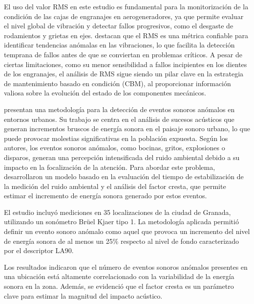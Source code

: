 El uso del valor RMS en este estudio es fundamental para la monitorización de la condición de las cajas de engranajes en aerogeneradores, ya que permite evaluar el nivel global de vibración y detectar fallos progresivos, como el desgaste de rodamientos y grietas en ejes. \citeauthor{igba_analysing_2016} \citeyear{igba_analysing_2016} destacan que el RMS es una métrica confiable para identificar tendencias anómalas en las vibraciones, lo que facilita la detección temprana de fallos antes de que se conviertan en problemas críticos. A pesar de ciertas limitaciones, como su menor sensibilidad a fallos incipientes en los dientes de los engranajes, el análisis de RMS sigue siendo un pilar clave en la estrategia de mantenimiento basado en condición (CBM), al proporcionar información valiosa sobre la evolución del estado de los componentes mecánicos.


\citeauthor{torija_metodologia_2018} \citeyear{torija_metodologia_2018} presentan una metodología para la detección de eventos sonoros anómalos en entornos urbanos. Su trabajo se centra en el análisis de sucesos acústicos que generan incrementos bruscos de energía sonora en el paisaje sonoro urbano, lo que puede provocar molestias significativas en la población expuesta. Según los autores, los eventos sonoros anómalos, como bocinas, gritos, explosiones o disparos, generan una percepción intensificada del ruido ambiental debido a su impacto en la focalización de la atención. Para abordar este problema, desarrollaron un modelo basado en la evaluación del tiempo de estabilización de la medición del ruido ambiental y el análisis del factor cresta, que permite estimar el incremento de energía sonora generado por estos eventos.

El estudio incluyó mediciones en 35 localizaciones de la ciudad de Granada, utilizando un sonómetro Brüel Kjaer tipo 1. La metodología aplicada permitió definir un evento sonoro anómalo como aquel que provoca un incremento del nivel de energía sonora de al menos un 25\% respecto al nivel de fondo caracterizado por el descriptor LA90.

Los resultados indicaron que el número de eventos sonoros anómalos presentes en una ubicación está altamente correlacionado con la variabilidad de la energía sonora en la zona. Además, se evidenció que el factor cresta es un parámetro clave para estimar la magnitud del impacto acústico.


